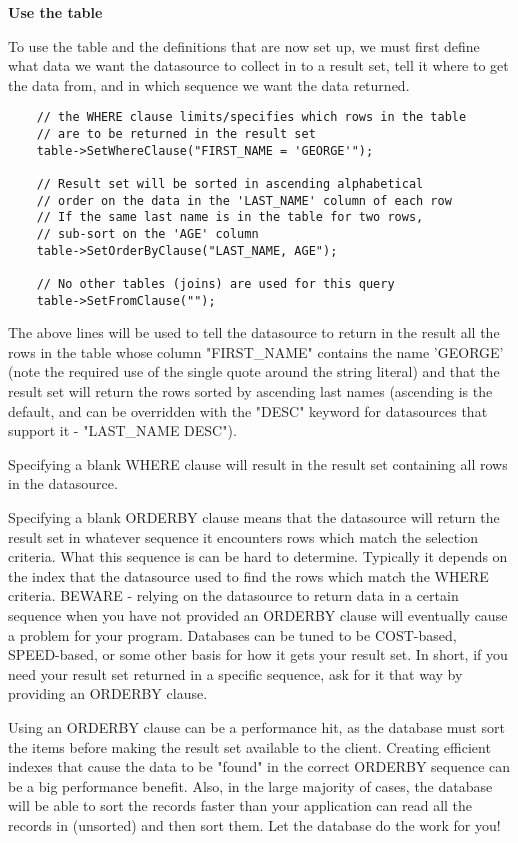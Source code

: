 {\bf Use the table}

To use the table and the definitions that are now set up, we must first 
define what data we want the datasource to collect in to a result set, tell 
it where to get the data from, and in which sequence we want the data returned.

\begin{verbatim}
    // the WHERE clause limits/specifies which rows in the table
    // are to be returned in the result set
    table->SetWhereClause("FIRST_NAME = 'GEORGE'");

    // Result set will be sorted in ascending alphabetical 
    // order on the data in the 'LAST_NAME' column of each row
    // If the same last name is in the table for two rows, 
    // sub-sort on the 'AGE' column
    table->SetOrderByClause("LAST_NAME, AGE");

    // No other tables (joins) are used for this query
    table->SetFromClause("");
\end{verbatim}

The above lines will be used to tell the datasource to return in the result 
all the rows in the table whose column "FIRST\_NAME" contains the name 
'GEORGE' (note the required use of the single quote around the string 
literal) and that the result set will return the rows sorted by ascending 
last names (ascending is the default, and can be overridden with the 
"DESC" keyword for datasources that support it - "LAST\_NAME DESC").

Specifying a blank WHERE clause will result in the result set containing 
all rows in the datasource.

Specifying a blank ORDERBY clause means that the datasource will return 
the result set in whatever sequence it encounters rows which match the 
selection criteria. What this sequence is can be hard to determine. 
Typically it depends on the index that the datasource used to find the 
rows which match the WHERE criteria. BEWARE - relying on the datasource 
to return data in a certain sequence when you have not provided an ORDERBY 
clause will eventually cause a problem for your program. Databases can be 
tuned to be COST-based, SPEED-based, or some other basis for how it gets 
your result set. In short, if you need your result set returned in a 
specific sequence, ask for it that way by providing an ORDERBY clause.

Using an ORDERBY clause can be a performance hit, as the database must 
sort the items before making the result set available to the client. 
Creating efficient indexes that cause the data to be "found" in the correct 
ORDERBY sequence can be a big performance benefit. Also, in the large 
majority of cases, the database will be able to sort the records faster 
than your application can read all the records in (unsorted) and then sort 
them. Let the database do the work for you!

